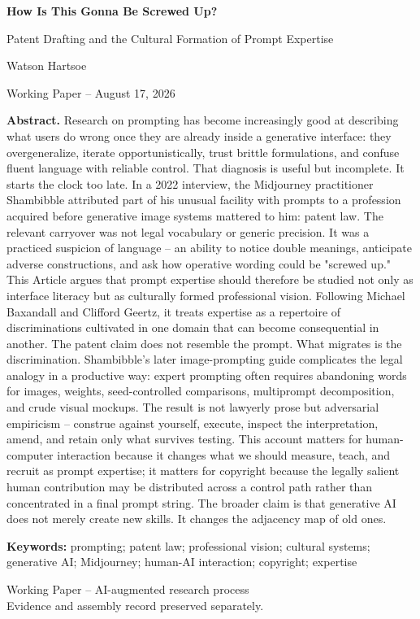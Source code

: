 \documentclass[11pt]{article}
\begin{document}
\begin{titlepage}
\thispagestyle{empty}
\vspace*{0.6in}
{\Large\bfseries How Is This Gonna Be Screwed Up?\par}
\vspace{0.2em}
{\large Patent Drafting and the Cultural Formation of Prompt Expertise\par}
\vspace{1.1em}
{\normalsize Watson Hartsoe\par}
{\small Working Paper -- August 17, 2026\par}
\vspace{1.4em}

\textbf{Abstract.} Research on prompting has become increasingly good at describing what users do wrong once they are already inside a generative interface: they overgeneralize, iterate opportunistically, trust brittle formulations, and confuse fluent language with reliable control. That diagnosis is useful but incomplete. It starts the clock too late. In a 2022 interview, the Midjourney practitioner Shambibble attributed part of his unusual facility with prompts to a profession acquired before generative image systems mattered to him: patent law. The relevant carryover was not legal vocabulary or generic precision. It was a practiced suspicion of language -- an ability to notice double meanings, anticipate adverse constructions, and ask how operative wording could be "screwed up." This Article argues that prompt expertise should therefore be studied not only as interface literacy but as culturally formed professional vision. Following Michael Baxandall and Clifford Geertz, it treats expertise as a repertoire of discriminations cultivated in one domain that can become consequential in another. The patent claim does not resemble the prompt. What migrates is the discrimination. Shambibble's later image-prompting guide complicates the legal analogy in a productive way: expert prompting often requires abandoning words for images, weights, seed-controlled comparisons, multiprompt decomposition, and crude visual mockups. The result is not lawyerly prose but adversarial empiricism -- construe against yourself, execute, inspect the interpretation, amend, and retain only what survives testing. This account matters for human-computer interaction because it changes what we should measure, teach, and recruit as prompt expertise; it matters for copyright because the legally salient human contribution may be distributed across a control path rather than concentrated in a final prompt string. The broader claim is that generative AI does not merely create new skills. It changes the adjacency map of old ones.

\vspace{0.8em}
\textbf{Keywords:} prompting; patent law; professional vision; cultural systems; generative AI; Midjourney; human-AI interaction; copyright; expertise

\vfill
\begin{flushright}
{\scriptsize Working Paper -- AI-augmented research process\\Evidence and assembly record preserved separately.}
\end{flushright}
\end{titlepage}
\end{document}
